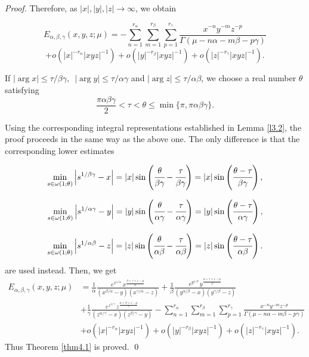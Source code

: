 \documentclass[12pt, reqno]{amsart}
\theoremstyle{definition}
\theoremstyle{remark}
\numberwithin{equation}{section}
\begin{document}
\begin{proof}
Therefore, as
$|x|,|y|,|z|\to\infty$,
we obtain

$$E_{\alpha,\beta,\gamma}(x,y,z;\mu)
=-\sum_{n=1}^{r_{\alpha}}
\sum_{m=1}^{r_{\beta}}
\sum_{p=1}^{r_{\gamma}}
\frac{x^{-n}y^{-m}z^{-p}}{\Gamma(\mu-n\alpha-m\beta-p\gamma)}$$
$$+o\!\left(|x|^{-r_{\alpha}}|xyz|^{-1}\right)
+
o\!\left(|y|^{-r_{\beta}}|xyz|^{-1}\right)
+
o\left(|z|^{-r_{\gamma}}|xyz|^{-1}\right).$$

If $ |\arg x| \leq \tau/\beta\gamma $,\,\, 
$  |\arg y| \leq \tau/\alpha\gamma$ and $  |\arg z| \leq \tau/\alpha\beta$, we choose a real number $\theta$ satisfying
$$
\frac{\pi\alpha\beta\gamma}{2}
<
\tau
<
\theta
\leq
\min\{\pi,\pi\alpha\beta\gamma\}.
$$

Using the corresponding integral representations established in Lemma \ref{l3.2}, the proof proceeds in the same way as the above one. The only difference is that the corresponding lower estimates

\[
\min_{s\in\omega(1;\theta)}
\left|s^{1/\beta\gamma}-x\right|
= |x|
\sin\left(\cfrac{\theta}{\beta\gamma}-\cfrac{\tau}{\beta\gamma}\right)=|x|\sin\left(\cfrac{\theta-\tau}{\beta\gamma}\right),
\]

\[
\min_{s\in\omega(1;\theta)}
\left|s^{1/\alpha\gamma}-y\right|
= |y|
\sin\left(\cfrac{\theta}{\alpha\gamma}-\cfrac{\tau}{\alpha\gamma}\right)=|y|\sin\left(\cfrac{\theta-\tau}{\alpha\gamma}\right),
\]

\[
\min_{s\in\omega(1;\theta)}
\left|s^{1/\alpha\beta}-z\right|
= |z|
\sin\left(\cfrac{\theta}{\alpha\beta}-\cfrac{\tau}{\alpha\beta}\right)=|z|\sin\left(\cfrac{\theta-\tau}{\alpha\beta}\right).
\]
are used instead.
Then, we get
$$\begin{aligned}
E_{\alpha,\beta,\gamma}(x,y,z;\mu)&=\frac{1}{\alpha}\frac{
e^{x^{1/\alpha}}
\,x^{\frac{\beta+\gamma+1-\mu}{\alpha}}}
{(x^{\beta/\alpha}-y)(x^{\gamma/\alpha}-z)}+\frac{1}{\beta}\frac{
e^{y^{1/\beta}}
\,y^{\frac{\alpha+\gamma+1-\mu}{\beta}}}
{(y^{\alpha/\beta}-x)(y^{\gamma/\beta}-z)}\\
&+
\frac{1}{\gamma}\frac{
e^{z^{1/\gamma}}
\,z^{\frac{\alpha+\beta+1-\mu}{\gamma}}}
{(z^{\alpha/\gamma}-x)(z^{\beta/\gamma}-y)}
-\sum_{n=1}^{r_{\alpha}}
\sum_{m=1}^{r_{\beta}}
\sum_{p=1}^{r_{\gamma}}
\frac{x^{-n}y^{-m}z^{-p}}{\Gamma(\mu-n\alpha-m\beta-p\gamma)}\\
&+o\!\left(|x|^{-r_{\alpha}}|xyz|^{-1}\right)
+
o\!\left(|y|^{-r_{\beta}}|xyz|^{-1}\right)
+
o\left(|z|^{-r_{\gamma}}|xyz|^{-1}\right).\end{aligned}$$
Thus Theorem \ref{thm4.1} is proved. \qed \end{proof}
\end{document}
